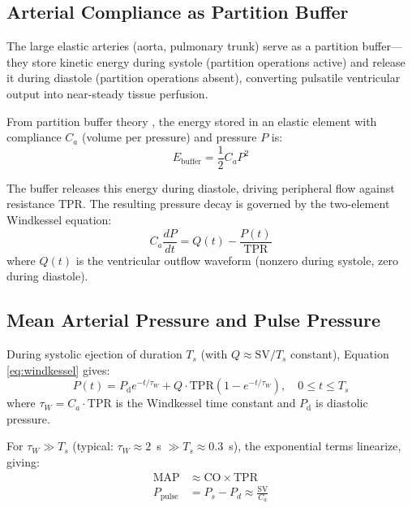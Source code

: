 \documentclass[12pt,a4paper]{article}
\theoremstyle{remark}
\newcommand{\CO}{\mathrm{CO}}
\newcommand{\SV}{\mathrm{SV}}
\newcommand{\MAP}{\mathrm{MAP}}
\newcommand{\TPR}{\mathrm{TPR}}
\begin{document}
\subsection{Arterial Compliance as Partition Buffer}

The large elastic arteries (aorta, pulmonary trunk) serve as a partition buffer—they store kinetic energy during systole (partition operations active) and release it during diastole (partition operations absent), converting pulsatile ventricular output into near-steady tissue perfusion.

From partition buffer theory \cite{sachikonye2024transport}, the energy stored in an elastic element with compliance $C_a$ (volume per pressure) and pressure $P$ is:
\begin{equation}
    E_{\mathrm{buffer}} = \frac{1}{2} C_a P^2
\end{equation}

The buffer releases this energy during diastole, driving peripheral flow against resistance $\TPR$. The resulting pressure decay is governed by the two-element Windkessel equation:
\begin{equation}
    C_a \frac{dP}{dt} = Q(t) - \frac{P(t)}{\TPR}
    \label{eq:windkessel}
\end{equation}
where $Q(t)$ is the ventricular outflow waveform (nonzero during systole, zero during diastole).

\subsection{Mean Arterial Pressure and Pulse Pressure}

During systolic ejection of duration $T_s$ (with $Q \approx \SV / T_s$ constant), Equation \ref{eq:windkessel} gives:
\begin{equation}
    P(t) = P_{\mathrm{d}} e^{-t/\tau_W} + Q \cdot \TPR \left(1 - e^{-t/\tau_W}\right), \quad 0 \leq t \leq T_s
\end{equation}
where $\tau_W = C_a \cdot \TPR$ is the Windkessel time constant and $P_{\mathrm{d}}$ is diastolic pressure.

For $\tau_W \gg T_s$ (typical: $\tau_W \approx 2$~s $\gg T_s \approx 0.3$~s), the exponential terms linearize, giving:
\begin{align}
    \MAP &\approx \CO \times \TPR \label{eq:map_from_windkessel} \\
    P_{\mathrm{pulse}} &= P_s - P_d \approx \frac{\SV}{C_a} \label{eq:pulse_pressure}
\end{align}
\end{document}
